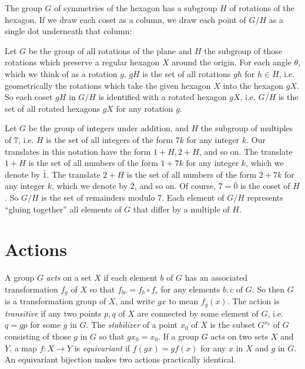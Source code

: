 \begin{example}
The group \(G\) of symmetries of the hexagon has a subgroup \(H\) of rotations of the hexagon.
If we  draw each coset as a column, we draw each point of \(G/H\) as a single dot underneath that column:
\begin{center}

\end{center}
\end{example}
\begin{example}
Let \(G\) be the group of all rotations of the plane and \(H\) the subgroup of those rotations which preserve a regular hexagon \(X\) around the origin.
For each angle \(\theta\), which we think of as a rotation \(g\), \(gH\) is the set of all rotations \(gh\) for \(h \in H\), i.e. geometrically the rotations which take the given hexagon \(X\) into the hexagon \(gX\).
So each coset \(gH\) in \(G/H\) is identified with a rotated hexagon \(gX\), i.e. \(G/H\) is the set of all rotated hexagons \(gX\) for any rotation \(g\).
\end{example}
\begin{example}
Let \(G\) be the group of integers under addition, and \(H\) the subgroup of multiples of \(7\), i.e. \(H\) is the set of all integers of the form \(7k\) for any integer \(k\).
Our translates in this notation have the form \(1+H, 2+H\), and so on.
The translate \(1+H\) is the set of all numbers of the form \(1+7k\) for any integer \(k\), which we denote by \(\bar{1}\).
The translate \(2+H\) is the set of all numbers of the form \(2+7k\) for any integer \(k\), which we denote by \(\bar{2}\), and so on.
Of course, \(\bar{7}=\bar{0}\) is the coset of \(H\).
So \(G/H\) is the set of remainders modulo \(7\).
Each element of \(G/H\) represents ``gluing together'' all elements of \(G\) that differ by a multiple of \(H\).
\end{example}

\section{Actions}

A group \(G\) \emph{acts} on a set \(X\) if each element \(b\) of \(G\) has an associated transformation \(f_g\) of \(X\)  so that \(f_{bc} = f_b \circ f_c\) for any elements \(b, c\) of \(G\).
So then \(G\) is a transformation group of \(X\), and write \(gx\) to mean \(f_g(x)\).
The action is \emph{transitive} if any two points \(p, q\) of \(X\) are connected by some element of \(G\), i.e. \(q=gp\) for some \(g\) in \(G\).
The \emph{stabilizer} of a point \(x_0\) of \(X\) is the subset \(G^{x_0}\) of \(G\) consisting of those \(g\) in \(G\) so that \(gx_0=x_0\).
If a group \(G\) acts on two sets \(X\) and \(Y\), a map \(f \colon X \to Y\) is \emph{equivariant} if \(f(gx)=gf(x)\) for any \(x\) in \(X\) and \(g\) in \(G\).
An equivariant bijection makes two actions practically identical.

